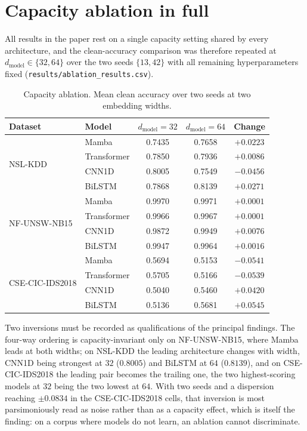 \documentclass[11pt,a4paper]{article}
\begin{document}
\section{Capacity ablation in full}
\label{sup:capacity}

All results in the paper rest on a single capacity setting shared by
every architecture, and the clean-accuracy comparison was therefore
repeated at $d_{\mathrm{model}}\in\{32,64\}$ over the two seeds
$\{13,42\}$ with all remaining hyperparameters fixed
(\texttt{results/ablation\_results.csv}).

\begin{table}[h]
\centering
\caption{Capacity ablation. Mean clean accuracy over two seeds at two
embedding widths.}
\label{tab:cap}
\small
\begin{tabular}{@{}llccc@{}}
\toprule
Dataset & Model & $d_{\mathrm{model}}=32$ & $d_{\mathrm{model}}=64$ & Change \\
\midrule
\multirow{4}{*}{NSL-KDD}
 & Mamba       & 0.7435 & 0.7658 & $+0.0223$ \\
 & Transformer & 0.7850 & 0.7936 & $+0.0086$ \\
 & CNN1D       & 0.8005 & 0.7549 & $-0.0456$ \\
 & BiLSTM      & 0.7868 & 0.8139 & $+0.0271$ \\
\midrule
\multirow{4}{*}{NF-UNSW-NB15}
 & Mamba       & 0.9970 & 0.9971 & $+0.0001$ \\
 & Transformer & 0.9966 & 0.9967 & $+0.0001$ \\
 & CNN1D       & 0.9872 & 0.9949 & $+0.0076$ \\
 & BiLSTM      & 0.9947 & 0.9964 & $+0.0016$ \\
\midrule
\multirow{4}{*}{CSE-CIC-IDS2018}
 & Mamba       & 0.5694 & 0.5153 & $-0.0541$ \\
 & Transformer & 0.5705 & 0.5166 & $-0.0539$ \\
 & CNN1D       & 0.5040 & 0.5460 & $+0.0420$ \\
 & BiLSTM      & 0.5136 & 0.5681 & $+0.0545$ \\
\bottomrule
\end{tabular}
\end{table}

Two inversions must be recorded as qualifications of the principal
findings. The four-way ordering is capacity-invariant only on
NF-UNSW-NB15, where Mamba leads at both widths; on NSL-KDD the leading
architecture changes with width, CNN1D being strongest at $32$
($0.8005$) and BiLSTM at $64$ ($0.8139$), and on CSE-CIC-IDS2018 the
leading pair becomes the trailing one, the two highest-scoring models
at $32$ being the two lowest at $64$. With two seeds and a dispersion reaching
$\pm0.0834$ in the CSE-CIC-IDS2018 cells, that inversion is most
parsimoniously read as noise rather than as a capacity effect, which is
itself the finding: on a corpus where models do not learn, an ablation
cannot discriminate.
\end{document}
